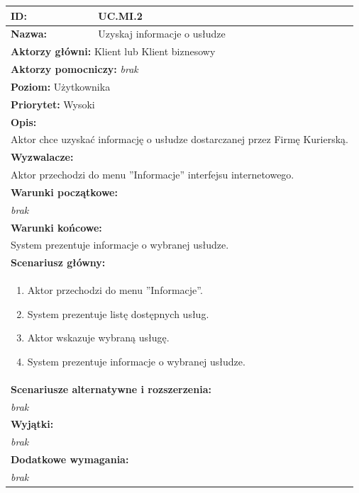 \begin{center}
\begin{longtable}[h]{|p{1.6cm}|p{13.5cm}|}
\hline
\textbf{ID:} & UC.MI.2 \\ \hline
\textbf{Nazwa:} & Uzyskaj informacje o usłudze \\ \hline
\multicolumn{2}{|p{15.1cm}|}{\textbf{Aktorzy główni:} Klient lub Klient biznesowy} \\
\multicolumn{2}{|p{15.1cm}|}{\textbf{Aktorzy pomocniczy:} 
\textit{brak}} \\
\multicolumn{2}{|p{15.1cm}|}{\textbf{Poziom:} Użytkownika} \\
\multicolumn{2}{|p{15.1cm}|}{\textbf{Priorytet:} Wysoki} \\
\hline
\multicolumn{2}{|p{15.1cm}|}{\textbf{Opis:}} \\
\multicolumn{2}{|p{15.1cm}|}{
Aktor chce uzyskać informację o usłudze dostarczanej przez Firmę Kurierską.
} \\ \hline
\multicolumn{2}{|p{15.1cm}|}{\textbf{Wyzwalacze:}} \\
\multicolumn{2}{|p{15.1cm}|}{
Aktor przechodzi do menu ''Informacje'' interfejsu internetowego.
} \\ \hline
\multicolumn{2}{|p{15.1cm}|}{\textbf{Warunki początkowe:}} \\
\multicolumn{2}{|p{15.1cm}|}{
\textit{brak}
} \\ \hline
\multicolumn{2}{|p{15.1cm}|}{\textbf{Warunki końcowe:}} \\
\multicolumn{2}{|p{15.1cm}|}{
System prezentuje informacje o wybranej usłudze.
} \\ \hline
\multicolumn{2}{|p{15.1cm}|}{\textbf{Scenariusz główny:}} \\
\multicolumn{2}{|p{15.1cm}|}{
\begin{enumerate}
\item Aktor przechodzi do menu ''Informacje''.
\item System prezentuje listę dostępnych usług.
\item Aktor wskazuje wybraną usługę.
\item System prezentuje informacje o wybranej usłudze.
\end{enumerate}
} \\ \hline
\multicolumn{2}{|p{15.1cm}|}{\textbf{Scenariusze alternatywne i rozszerzenia:}} \\
\multicolumn{2}{|p{15.1cm}|}{
\textit{brak}} \\ \hline
\multicolumn{2}{|p{15.1cm}|}{\textbf{Wyjątki:}} \\
\multicolumn{2}{|p{15.1cm}|}{
\textit{brak}
} \\ \hline
\multicolumn{2}{|p{15.1cm}|}{\textbf{Dodatkowe wymagania:}} \\
\multicolumn{2}{|p{15.1cm}|}{
\textit{brak}
} \\
\hline
\end{longtable}
\end{center}

